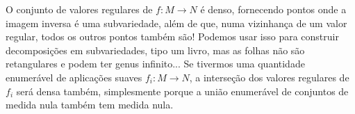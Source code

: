 \documentclass[../differential_topology.tex]{subfiles}
\begin{document}
\begin{tcolorbox}[
		skin=enhanced,
		title=Observação,
		fonttitle=\bfseries,
		colframe=black,
		colbacktitle=cyan!75!white,
		colback=cyan!15,
		colbacklower=black,
		coltitle=black,
		drop fuzzy shadow,
	]
	O conjunto de valores regulares de \(f:M\rightarrow N\) é denso, fornecendo pontos onde a imagem inversa é uma subvariedade, além de que, numa vizinhança de um valor regular, todos os outros pontos também são! Podemos usar isso para construir decomposições em subvariedades, tipo um livro, mas as folhas não são retangulares e podem ter genus infinito...
	Se tivermos uma quantidade enumerável de aplicações suaves \(f_{i}:M\rightarrow N\), a interseção dos valores regulares de \(f_{i}\) será densa também, simplesmente porque a união enumerável de conjuntos de medida nula também tem medida nula.
\end{tcolorbox}
\end{document}
